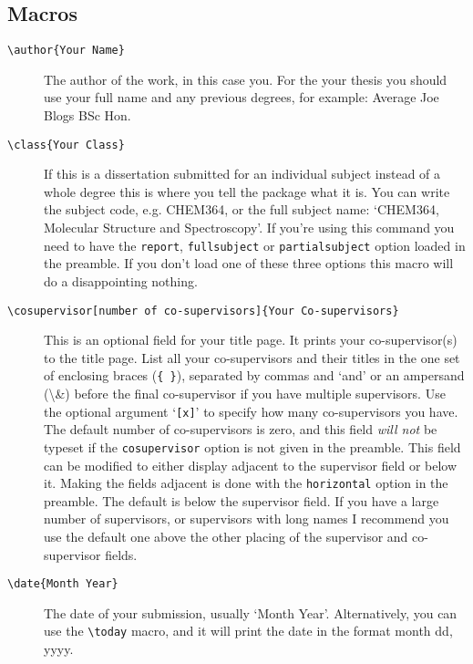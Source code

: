 \documentclass[12pt,oneside]{article}
\newcommand{\option}[1]{\texttt{\color{Green}#1}} %
\newcommand{\command}[1]{\texttt{\color{Red}#1}} %
\newcommand{\comoptions}[1]{\texttt{\color{Blue}#1}} %
\begin{document}
\subsection*{Macros}
\begin{description}
    \item[\command{\textbackslash{}author}\comoptions{\{Your Name\}}]
    The author of the work, in this case you. For the your thesis you should use your full name and any previous degrees, for example: Average Joe Blogs BSc Hon.
    
    \item[\command{\textbackslash{}class}\comoptions{\{Your Class\}}] If this is a dissertation submitted for an individual subject instead of a whole degree this is where you tell the package what it is. You can write the subject code, e.g. CHEM364, or the full subject name: `CHEM364, Molecular Structure and Spectroscopy'. If you're using this command you need to have the \option{report}, \option{fullsubject} or \option{partialsubject} option loaded in the preamble. If you don't load one of these three options this macro will do a disappointing nothing.
    
    \item[\command{\textbackslash{}cosupervisor}\option{[number of co-supervisors]}\comoptions{\{Your Co-supervisors\}}] This is an optional field for your title page. It prints your co-super\-visor(s) to the title page. List all your co-supervisors and their titles in the one set of enclosing braces (\comoptions{\{ \}}), separated by commas and `and' or an ampersand (\textbackslash{}\&) before the final co-supervisor if you have multiple supervisors. Use the optional argument `\option{[x]}' to specify how many co-supervisors you have. The default number of co-supervisors is zero, and this field \emph{will not} be typeset if the \option{cosupervisor} option is not given in the preamble. This field can be modified to either display adjacent to the supervisor field or below it. Making the fields adjacent is done with the \option{horizontal} option in the preamble. The default is below the supervisor field. If you have a large number of supervisors, or supervisors with long names I recommend you use the default one above the other placing of the supervisor and co-supervisor fields.
    
    \item[\command{\textbackslash{}date}\comoptions{\{Month Year\}}] The date of your submission, usually `Month Year'. Alternatively, you can use the \command{\textbackslash{}today} macro, and it will print the date in the format month dd, yyyy.
    

\end{description}
\end{document}
